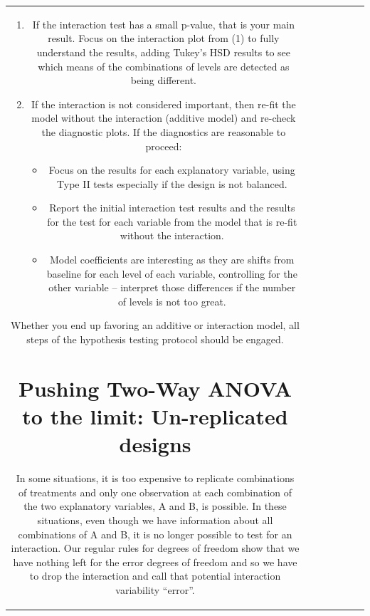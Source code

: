 \documentclass[]{book}
\newenvironment{Shaded}{\begin{snugshade}}{\end{snugshade}}
\theoremstyle{definition}
\theoremstyle{definition}
\theoremstyle{remark}
\begin{document}
\begin{longtable}[]{@{}ccccccc@{}}
\begin{minipage}[b]{0.10\columnwidth}
\begin{Shaded}
\begin{Highlighting}[]
\begin{Shaded}
\begin{Highlighting}[]
\begin{Shaded}
\begin{Highlighting}[]
\begin{Shaded}
\begin{Highlighting}[]
\begin{Shaded}
\begin{Highlighting}[]
\begin{Shaded}
\begin{Highlighting}[]
\begin{enumerate}
\def\labelenumi{\arabic{enumi}.}
\setcounter{enumi}{3}
\item
  If the interaction test has a small p-value, that is your main result.
  Focus on the interaction plot from (1) to fully understand the
  results, adding Tukey's HSD results to see which means of the
  combinations of levels are detected as being different.
\item
  If the interaction is not considered important, then re-fit the model
  without the interaction (additive model) and re-check the diagnostic
  plots. If the diagnostics are reasonable to proceed:

  \begin{itemize}
  \item
    Focus on the results for each explanatory variable, using Type II
    tests especially if the design is not balanced.
  \item
    Report the initial interaction test results and the results for the
    test for each variable from the model that is re-fit without the
    interaction.
  \item
    Model coefficients are interesting as they are shifts from baseline
    for each level of each variable, controlling for the other variable
    -- interpret those differences if the number of levels is not too
    great.
  \end{itemize}
\end{enumerate}

Whether you end up favoring an additive or interaction model, all steps
of the hypothesis testing protocol should be engaged.

\section{Pushing Two-Way ANOVA to the limit: Un-replicated
designs}\label{section4-6}

In some situations, it is too expensive to replicate combinations of
treatments and only one observation at each combination of the two
explanatory variables, A and B, is possible. In these situations, even
though we have information about all combinations of A and B, it is no
longer possible to test for an interaction. Our regular rules for
degrees of freedom show that we have nothing left for the error degrees
of freedom and so we have to drop the interaction and call that
potential interaction variability ``error''.


\end{Highlighting}
\end{Shaded}
\end{Highlighting}
\end{Shaded}
\end{Highlighting}
\end{Shaded}
\end{Highlighting}
\end{Shaded}
\end{Highlighting}
\end{Shaded}
\end{Highlighting}
\end{Shaded}
\end{minipage}
\end{longtable}
\end{document}
